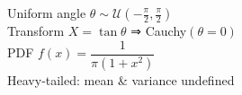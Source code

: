 \documentclass[preview]{standalone}
\begin{document}
Uniform angle  $\theta\sim\mathcal U\!\left(-\tfrac{\pi}{2},\tfrac{\pi}{2}\right)$\\Transform  $X=\tan\theta$  ⇒  Cauchy$(\theta=0)$\\PDF  $\displaystyle f(x)=\dfrac{1}{\pi(1+x^2)}$\\Heavy‑tailed: mean & variance undefined\\
\end{document}
